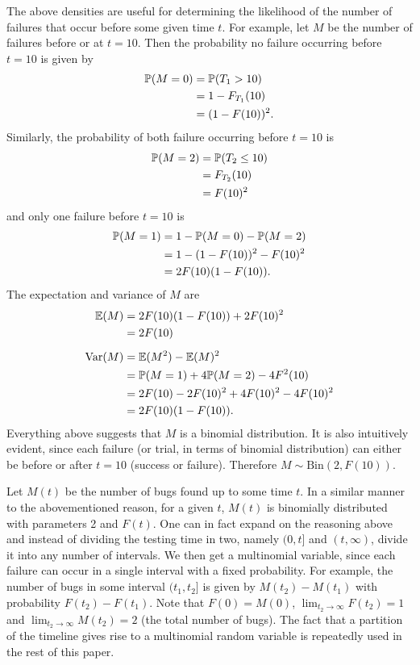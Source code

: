 The above densities are useful for determining the likelihood of the number of failures that occur before some given time $t$. For example, let $M$ be the number of failures before or at $t=10$. Then the probability no failure occurring before $t=10$ is given by
\begin{align*}
    \mathbb{P}(M=0)&=\mathbb{P}(T_1 > 10)\\
    &=1-F_{T_1}(10)\\
    &=(1-F(10))^2.
\end{align*}
Similarly, the probability of both failure occurring before $t=10$ is
\begin{align*}
    \mathbb{P}(M=2)&=\mathbb{P}(T_2\leq 10)\\
    &=F_{T_2}(10)\\
    &=F(10)^2\\
\end{align*}
and only one failure before $t=10$ is
\begin{align*}
    \mathbb{P}(M=1) &= 1- \mathbb{P}(M=0) - \mathbb{P}(M=2)\\
    &=1 - (1 - F(10))^2 - F(10)^2\\
    &=2F(10)(1-F(10)).
\end{align*}
The expectation and variance of $M$ are
\begin{align*}
    \mathbb{E}(M) &= 2F(10)(1-F(10)) + 2F(10)^2\\
    &=2F(10)\\[0.5 em]
    \text{Var}(M) &= \mathbb{E}(M^2)-\mathbb{E}(M)^2\\
    &=\mathbb{P}(M=1)+4\mathbb{P}(M=2)-4F^2(10)\\
    &=2F(10) - 2F(10)^2 + 4F(10)^2 - 4F(10)^2\\
    &=2F(10)(1-F(10)).
\end{align*}
Everything above suggests that $M$ is a binomial distribution. It is also intuitively evident, since each failure (or trial, in terms of binomial distribution) can either be before or after $t=10$ (success or failure). Therefore $M\sim\text{Bin}(2, F(10))$.

Let $M(t)$ be the number of bugs found up to some time $t$. In a similar manner to the abovementioned reason, for a given $t$, $M(t)$ is binomially distributed with parameters 2 and $F(t)$. One can in fact expand on the reasoning above and instead of dividing the testing time in two, namely $(0,t]$ and $(t, \infty)$, divide it into any number of intervals. We then get a multinomial variable, since each failure can occur in a single interval with a fixed probability. For example, the number of bugs in some interval $(t_1, t_2]$ is given by $M(t_2)-M(t_1)$ with probability $F(t_2)-F(t_1)$. Note that $F(0)=M(0)$, $\lim_{t_2\to\infty}F(t_2)=1$ and $\lim_{t_2\to\infty}M(t_2)=2$ (the total number of bugs). The fact that a partition of the timeline gives rise to a multinomial random variable is repeatedly used in the rest of this paper.

